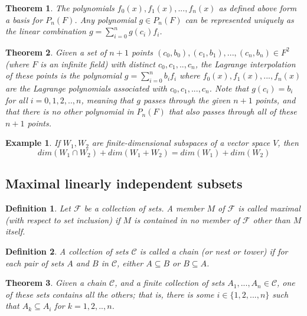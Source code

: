 \documentclass[a4paper]{article}
\newtheorem{mytheorem}{Theorem}
\newtheorem{example}{Example}
\newtheorem{mydef}{Definition}
\numberwithin{mytheorem}{section}
\numberwithin{mydef}{section}
\numberwithin{example}{section}
\begin{document}
\begin{mytheorem} The polynomials $f_{0}(x),f_{1}(x),...,f_{n}(x)$ as defined above form a basis for $P_{n}(F)$. Any polynomial $g \in P_{n}(F)$ can be represented uniquely as the linear combination $g = \sum^{n}_{i=0}g(c_{i})f_{i}$.
\end{mytheorem}

\begin{mytheorem} Given a set of $n+1$ points $(c_{0},b_{0}),(c_{1},b_{1}),...,(c_{n},b_{n}) \in F^{2}$ (where $F$ is an infinite field) with distinct $c_{0},c_{1},..,c_{n}$, the Lagrange interpolation of these points is the polynomial $g = \sum^{n}_{i= 0}b_{i}f_{i}$ where $f_{0}(x),f_{1}(x),...,f_{n}(x)$ are the Lagrange polynomials associated with $c_{0},c_{1},...,c_{n}$. Note that $g(c_{i}) = b_{i}$ for all $i = 0,1,2,..,n$, meaning that $g$ passes through the given $n+1$ points, and that there is no other polynomial in $P_{n}(F)$ that also passes through all of these $n+1$ points.
\end{mytheorem}

\begin{example} If $W_{1},W_{2}$ are finite-dimensional subspaces of a vector space $V$, then $$dim(W_{1} \cap W_{2}) + dim(W_{1} + W_{2}) = dim(W_{1}) + dim(W_{2})$$
\end{example}

\subsection{Maximal linearly independent subsets}

\begin{mydef} Let $\mathcal{F}$ be a collection of sets. A member $M$ of $\mathcal{F}$ is called maximal (with respect to set inclusion) if $M$ is contained in no member of $\mathcal{F}$ other than $M$ itself.
\end{mydef}

\begin{mydef} A collection of sets $\mathcal{C}$ is called a chain (or nest or tower) if for each pair of sets $A$ and $B$ in $\mathcal{C}$, either $A \subseteq B$ or $B \subseteq A$. 
\end{mydef}

\begin{mytheorem} Given a chain $\mathcal{C}$, and a finite collection of sets $A_{1},...,A_{n} \in \mathcal{C}$, one of these sets contains all the others; that is, there is some $i \in \{ 1,2,...,n \} $ such that $A_{k} \subseteq A_{i}$ for $k = 1,2,..,n$.
\end{mytheorem}
\end{document}
